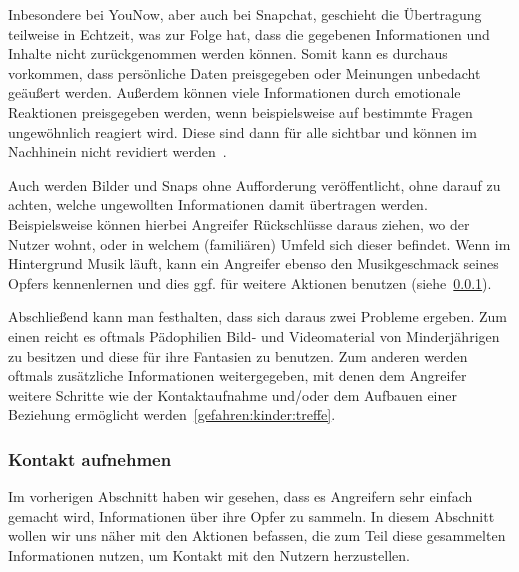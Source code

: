 Inbesondere bei YouNow, aber auch bei Snapchat, geschieht die \"Ubertragung
teilweise in Echtzeit, was zur Folge hat, dass die gegebenen Informationen und
Inhalte nicht zur\"uckgenommen werden k\"onnen. Somit kann es durchaus
vorkommen, dass pers\"onliche Daten preisgegeben oder Meinungen unbedacht
ge\"au{\ss}ert werden. Au{\ss}erdem k\"onnen viele Informationen durch
emotionale Reaktionen preisgegeben werden, wenn beispielsweise auf bestimmte
Fragen ungew\"ohnlich reagiert wird. Diese sind dann f\"ur alle sichtbar und
k\"onnen im Nachhinein nicht revidiert werden~\cite{KS15}.

Auch werden Bilder und Snaps ohne Aufforderung ver\"offentlicht, ohne darauf zu
achten, welche ungewollten Informationen damit \"ubertragen werden.
Beispielsweise k\"onnen hierbei Angreifer R\"uckschl\"usse daraus ziehen, wo
der Nutzer wohnt, oder in welchem (famili\"aren) Umfeld sich dieser befindet.
Wenn im Hintergrund Musik l\"auft, kann ein Angreifer ebenso den Musikgeschmack
seines Opfers kennenlernen und dies ggf. f\"ur weitere Aktionen benutzen
(siehe~\ref{gefahren:kinder:treffen}).

Abschlie{\ss}end kann man festhalten, dass sich daraus zwei Probleme ergeben.
Zum einen reicht es oftmals P\"adophilien Bild- und Videomaterial von
Minderj\"ahrigen zu besitzen und diese f\"ur ihre Fantasien zu benutzen. Zum
anderen werden oftmals zus\"atzliche Informationen weitergegeben, mit denen dem
Angreifer weitere Schritte wie der Kontaktaufnahme und/oder dem Aufbauen einer
Beziehung erm\"oglicht werden~\ref{gefahren:kinder:treffe}.

\subsubsection{Kontakt aufnehmen}
\label{gefahren:kinder:treffen}
Im vorherigen Abschnitt haben wir gesehen, dass es Angreifern sehr einfach
gemacht wird, Informationen \"uber ihre Opfer zu sammeln. In diesem Abschnitt
wollen wir uns n\"aher mit den Aktionen befassen, die zum Teil diese
gesammelten Informationen nutzen, um Kontakt mit den Nutzern herzustellen.
